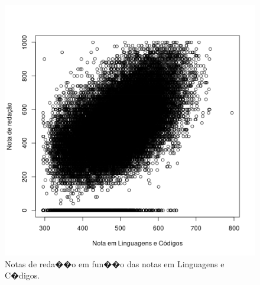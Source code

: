 \documentclass[12pt]{article}
\begin{document}
\vspace{2cm}

\begin{minipage}{.5\textwidth}
    \begin{figure}[H]
    \centering\includegraphics[width=\linewidth]{../correlacao_nota_lc.png}
    \caption{Notas de reda��o em fun��o das notas em Linguagens e C�digos.}
    \label{fig:correlacao-nota-lc}
    \end{figure}
\end{minipage}%
\end{document}
